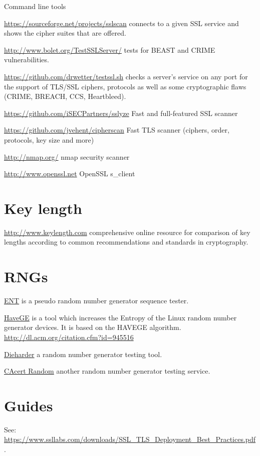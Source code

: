 Command line tools
\begin{itemize*}
  \item \url{https://sourceforge.net/projects/sslscan} connects to a given SSL service and shows the cipher suites that are offered.
  \item \url{http://www.bolet.org/TestSSLServer/} tests for BEAST and CRIME vulnerabilities.
  \item \url{https://github.com/drwetter/testssl.sh} checks a server's service on any port for the support of TLS/SSL ciphers, protocols as well as some cryptographic flaws (CRIME, BREACH, CCS, Heartbleed).
  \item \url{https://github.com/iSECPartners/sslyze} Fast and full-featured SSL scanner
  \item \url{https://github.com/jvehent/cipherscan} Fast TLS scanner (ciphers, order, protocols, key size and more)
  \item \url{http://nmap.org/} nmap security scanner
  \item \url{http://www.openssl.net} OpenSSL s\_client
\end{itemize*}


\section{Key length}
\begin{itemize*}
  \item \url{http://www.keylength.com} comprehensive online resource for comparison of key lengths according to common recommendations and standards in cryptography.
\end{itemize*}


\section{RNGs}

\begin{itemize*}
  \item \href{http://www.fourmilab.ch/random/}{ENT} is a pseudo random number generator sequence tester.
  \item \href{http://www.issihosts.com/haveged/}{HaveGE} is a tool which increases the Entropy of the Linux random number generator devices. It is based on the HAVEGE algorithm. \url{http://dl.acm.org/citation.cfm?id=945516}
  \item \href{http://www.phy.duke.edu/~rgb/General/dieharder.php}{Dieharder} a random number generator testing tool.
  \item \href{http://www.cacert.at/random/}{CAcert Random} another random number generator testing service.
\end{itemize*}

\section{Guides}
\begin{itemize*}
  \item See: \url{https://www.ssllabs.com/downloads/SSL_TLS_Deployment_Best_Practices.pdf}.
\end{itemize*}
